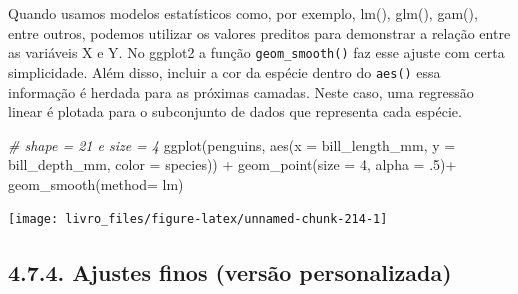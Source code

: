 \documentclass[
]{book}
\newenvironment{Shaded}{\begin{snugshade}}{\end{snugshade}}
\newcommand{\AttributeTok}[1]{\textcolor[rgb]{0.61,0.61,0.61}{#1}}
\newcommand{\CommentTok}[1]{\textcolor[rgb]{0.37,0.37,0.37}{\textit{#1}}}
\newcommand{\DecValTok}[1]{\textcolor[rgb]{0.06,0.06,0.06}{#1}}
\newcommand{\FunctionTok}[1]{\textcolor[rgb]{0,0,0}{#1}}
\newcommand{\NormalTok}[1]{#1}
\newcommand{\SpecialCharTok}[1]{\textcolor[rgb]{0,0,0}{#1}}
\begin{document}
Quando usamos modelos estatísticos como, por exemplo, lm(), glm(), gam(), entre outros, podemos utilizar os valores preditos para demonstrar a relação entre as variáveis X e Y. No ggplot2 a função \texttt{geom\_smooth()} faz esse ajuste com certa simplicidade. Além disso, incluir a cor da espécie dentro do \texttt{aes()} essa informação é herdada para as próximas camadas. Neste caso, uma regressão linear é plotada para o subconjunto de dados que representa cada espécie.

\begin{Shaded}
\begin{Highlighting}[]

\CommentTok{\# shape = 21 e size = 4}
\FunctionTok{ggplot}\NormalTok{(penguins, }
       \FunctionTok{aes}\NormalTok{(}\AttributeTok{x =}\NormalTok{ bill\_length\_mm, }\AttributeTok{y =}\NormalTok{ bill\_depth\_mm, }\AttributeTok{color =}\NormalTok{ species)) }\SpecialCharTok{+}
  \FunctionTok{geom\_point}\NormalTok{(}\AttributeTok{size =} \DecValTok{4}\NormalTok{, }\AttributeTok{alpha =}\NormalTok{ .}\DecValTok{5}\NormalTok{)}\SpecialCharTok{+}
  \FunctionTok{geom\_smooth}\NormalTok{(}\AttributeTok{method=}\NormalTok{ lm)}
\end{Highlighting}
\end{Shaded}

\begin{center}\texttt{[image: livro\_files/figure-latex/unnamed-chunk-214-1]} \end{center}

\hypertarget{ajustes-finos-versuxe3o-personalizada-5}{%
\subsection{4.7.4. Ajustes finos (versão personalizada)}\label{ajustes-finos-versuxe3o-personalizada-5}}
\end{document}
